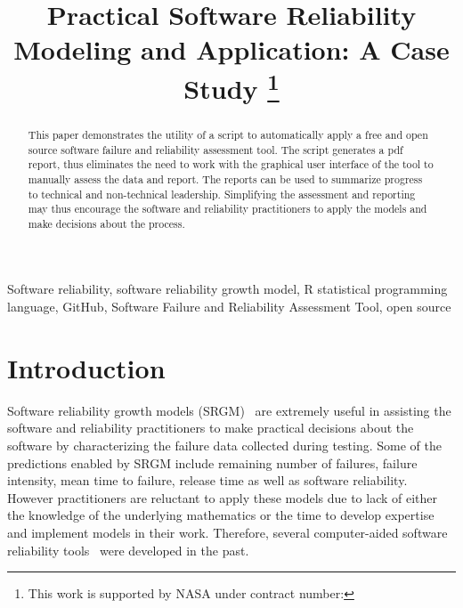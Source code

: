 \documentclass[conference]{IEEEtran}
\begin{document}
\title{Practical Software Reliability Modeling and Application: A Case Study
\thanks{This work is supported by NASA under contract number: }
}



\author{
\and
{}
}

\maketitle

\begin{abstract}
This paper demonstrates the utility of a script to automatically apply a free and open source software failure and reliability assessment tool. The script generates a pdf report, thus eliminates the need to work with the graphical user interface of the tool to manually assess the data and report. The reports can be used to summarize progress to technical and non-technical leadership. Simplifying the assessment and reporting may thus encourage the software and reliability practitioners to apply the models and make decisions about the process.
\end{abstract}

\begin{IEEEkeywords}
Software reliability, software reliability growth model, R statistical programming language, GitHub, Software Failure and Reliability Assessment Tool, open source
\end{IEEEkeywords}


\section{Introduction}\label{sec:Intro}
Software reliability growth models (SRGM)~\cite{BookHoSRE} are extremely useful in assisting the software and reliability practitioners to make practical decisions about the software by characterizing the failure data collected during testing. Some of the predictions enabled by SRGM include remaining number of failures, failure intensity, mean time to failure, release time as well as software reliability. However practitioners are reluctant to apply these models due to lack of either the knowledge of the underlying mathematics or the time to develop expertise and implement models in their work. Therefore, several computer-aided software reliability tools~\cite{trSMERFS,inProcISSRE2013_100,lyu1992casre} were developed in the past.
\end{document}
